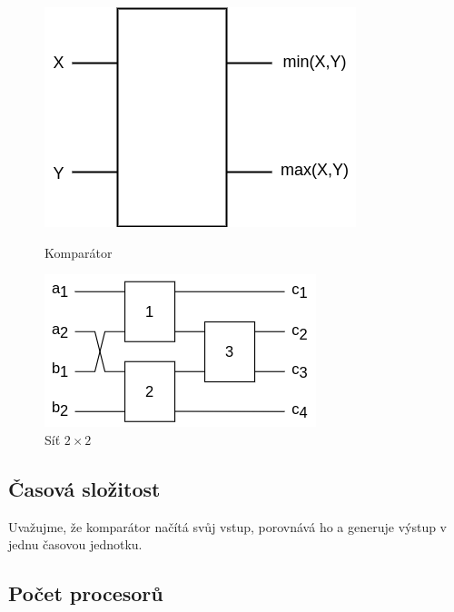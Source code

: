 \documentclass[12pt,a4paper]{article}
\begin{document}
\begin{figure}[H]
\centering
    \begin{minipage}{.45\textwidth}
        \centering
        \includegraphics[width=.9\textwidth]{img/comparator.png}
        \caption{Komparátor}
        \label{fig:net1x1}
    \end{minipage}
    \hfill
    \begin{minipage}{.5\textwidth}
        \centering
        \includegraphics[width=.9\textwidth]{img/net2x2.png}
        \caption{Síť $2\times2$}
        \label{fig:net2x2}
    \end{minipage}
\end{figure}

\subsection*{Časová složitost}
\label{sub:casova_slozitost}
Uvažujme, že komparátor načítá svůj vstup, porovnává ho a generuje výstup v jednu časovou jednotku. 


\subsection*{Počet procesorů}
\label{sub:pocet_procesoru}
\end{document}
